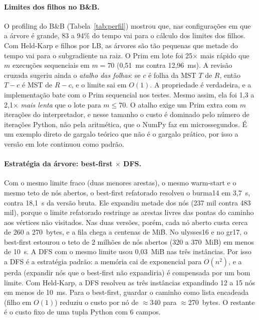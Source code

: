 \paragraph{Limites dos filhos no B\&B.} O profiling do B\&B
(Tabela~\ref{tab:perfil}) mostrou que, nas configurações em que a árvore é
grande, 83 a 94\% do tempo vai para o cálculo dos limites dos filhos. Com
Held-Karp e filhos por LB, as árvores são tão pequenas que metade do tempo
vai para o subgradiente na raiz. O Prim em lote foi
25$\times$ mais rápido que $m$ execuções sequenciais em $m=70$ (0,51~ms
contra 12,96~ms). A revisão cruzada sugeriu ainda o \emph{atalho das
folhas}: se $c$ é folha da MST $T$ de $R$, então $T-c$ é MST de $R-c$, e
o limite sai em $O(1)$. A propriedade é verdadeira, e a implementação bate
com o Prim sequencial nos testes. Mesmo assim, ela foi 1,3 a 2,1$\times$
\emph{mais lenta} que o lote para $m\le70$. O atalho exige um Prim extra
com $m$ iterações do interpretador, e nesse tamanho o custo é dominado pelo
número de iterações Python, não pela aritmética, que o NumPy faz em
microssegundos. É um exemplo direto de gargalo teórico que não é o gargalo
prático, por isso a versão em lote continuou como padrão.




\paragraph{Estratégia da árvore: best-first $\times$ DFS.} Com o mesmo
limite fraco (duas menores arestas), o mesmo warm-start e o mesmo teto de
nós abertos, o best-first refatorado resolveu o burma14 em 3,7~s, contra
18,1~s da versão bruta. Ele expandiu metade dos nós (237 mil contra 483
mil), porque o limite refatorado restringe as arestas livres das pontas do
caminho aos vértices não visitados. Nas duas versões, porém, cada nó aberto
custa cerca de 260 a 270~bytes, e a fila chega a centenas de MiB. No
ulysses16 e no gr17, o best-first estourou o teto de 2 milhões de nós
abertos (320 a 370~MiB) em menos de 10~s. A DFS com o mesmo limite usou
0,03~MiB nas três instâncias. Por isso a DFS é a estratégia padrão: a
memória cai de exponencial para $O(n^2)$, e a perda (expandir nós que o
best-first não expandiria) é compensada por um bom limite. Com Held-Karp, a
DFS resolveu as três instâncias expandindo 12 a 15 nós em menos de 10~ms.
Para o best-first, guardar o caminho como lista encadeada (filho em $O(1)$)
reduziu o custo por nó de $\approx$340 para $\approx$270~bytes. O restante
é o custo fixo de uma tupla Python com 6 campos.
